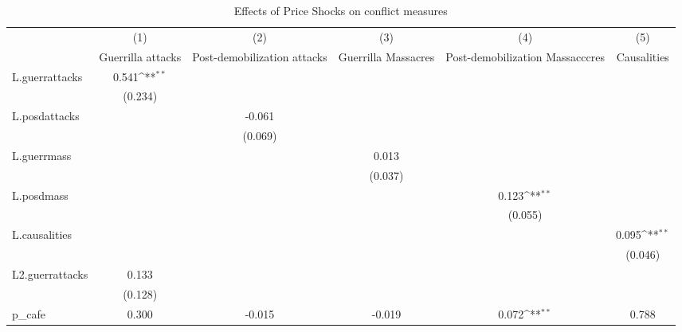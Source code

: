 \begin{table}[htbp]\centering
\def\sym#1{\ifmmode^{#1}\else\(^{#1}\)\fi}
\caption{Effects of Price Shocks on conflict measures}
\begin{tabular}{l*{5}{c}}
\hline\hline
                &\multicolumn{1}{c}{(1)}&\multicolumn{1}{c}{(2)}&\multicolumn{1}{c}{(3)}&\multicolumn{1}{c}{(4)}&\multicolumn{1}{c}{(5)}\\
                &\multicolumn{1}{c}{Guerrilla attacks}&\multicolumn{1}{c}{Post-demobilization attacks}&\multicolumn{1}{c}{Guerrilla Massacres}&\multicolumn{1}{c}{Post-demobilization Massacccres}&\multicolumn{1}{c}{Causalities}\\
\hline
L.guerrattacks  &    0.541\sym{**} &                  &                  &                  &                  \\
                &  (0.234)         &                  &                  &                  &                  \\
[1em]
L.posdattacks   &                  &   -0.061         &                  &                  &                  \\
                &                  &  (0.069)         &                  &                  &                  \\
[1em]
L.guerrmass     &                  &                  &    0.013         &                  &                  \\
                &                  &                  &  (0.037)         &                  &                  \\
[1em]
L.posdmass      &                  &                  &                  &    0.123\sym{**} &                  \\
                &                  &                  &                  &  (0.055)         &                  \\
[1em]
L.causalities   &                  &                  &                  &                  &    0.095\sym{**} \\
                &                  &                  &                  &                  &  (0.046)         \\
[1em]
L2.guerrattacks &    0.133         &                  &                  &                  &                  \\
                &  (0.128)         &                  &                  &                  &                  \\
[1em]
p\_cafe          &    0.300         &   -0.015         &   -0.019         &    0.072\sym{**} &    0.788         \\

\end{tabular}
\end{table}
